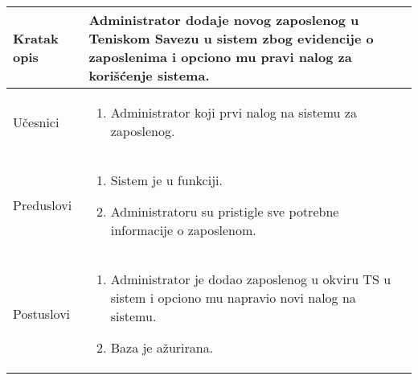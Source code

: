\documentclass{article}
\begin{document}
\begin{longtable}{| p{} | p{} |} 
\hline
    Kratak opis & Administrator dodaje novog zaposlenog u Teniskom Savezu u sistem zbog evidencije o zaposlenima i opciono mu pravi nalog za korišćenje sistema.\\ 
\hline    
    Učesnici & \begin{enumerate}
        \item Administrator koji prvi nalog na sistemu za zaposlenog.
    \end{enumerate}
    \\
\hline
   Preduslovi & \begin{enumerate}
       \item Sistem je u funkciji.
       \item Administratoru su pristigle sve potrebne informacije o zaposlenom.
   \end{enumerate}\\
\hline  
    Postuslovi & \begin{enumerate}
        \item Administrator je dodao zaposlenog u okviru TS u sistem i opciono mu napravio novi nalog na sistemu.
        \item Baza je ažurirana.
        

\end{enumerate}
\end{longtable}
\end{document}
